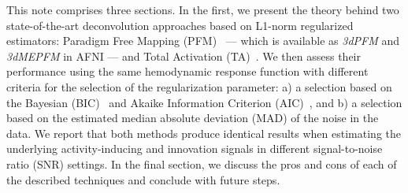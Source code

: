 This note comprises three sections. In the first, we present the theory behind two state-of-the-art deconvolution approaches based on L1-norm regularized estimators: Paradigm Free Mapping (PFM)~\cite{gaudes2013paradigm} --- which is available as \textit{3dPFM} and \textit{3dMEPFM} in AFNI --- and Total Activation (TA)~\cite{karahanouglu2013total}. We then assess their performance using the same hemodynamic response function with different criteria for the selection of the regularization parameter: a) a selection based on the Bayesian (BIC)~\cite{schwarz1978estimating} and Akaike Information Criterion (AIC)~\cite{akaike1998information}, and b) a selection based on the estimated median absolute deviation (MAD) of the noise in the data. We report that both methods produce identical results when estimating the underlying activity-inducing and innovation signals in different signal-to-noise ratio (SNR) settings. In the final section, we discuss the pros and cons of each of the described techniques and conclude with future steps.